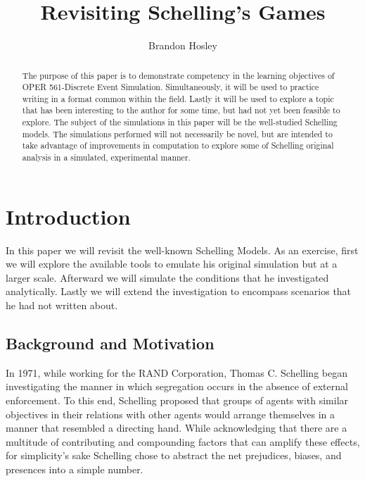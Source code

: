 \documentclass[sigplan,nonacm]{acmart}
\begin{document}
\title{Revisiting Schelling's Games}

\author{Brandon Hosley}


\begin{abstract}
	The purpose of this paper is to demonstrate competency in the learning 
	objectives of OPER 561-Discrete Event Simulation.
	Simultaneously, it will be used to practice writing in a format
	common within the field.
	Lastly it will be used to explore a topic that has been interesting
	to the author for some time, but had not yet been feasible to explore.
	The subject of the simulations in this paper will be the well-studied
	Schelling models. The simulations performed will not necessarily be
	novel, but are intended to take advantage of improvements in computation
	to explore some of Schelling original analysis in a simulated, experimental manner.
\end{abstract}



\maketitle

\section{Introduction}

In this paper we will revisit the well-known Schelling Models\cite{Schelling1971}.
As an exercise, first we will explore the available tools to emulate his original
simulation but at a larger scale.
Afterward we will simulate the conditions that he investigated analytically.
Lastly we will extend the investigation to encompass scenarios that he had not
written about.

\subsection{Background and Motivation}

In 1971, while working for the RAND Corporation, Thomas C. Schelling began investigating
the manner in which segregation occurs in the absence of external enforcement.
To this end, Schelling proposed that groups of agents with similar objectives in their relations
with other agents would arrange themselves in a manner that resembled a directing hand.
While acknowledging that there are a multitude of contributing and compounding factors that can amplify these effects, 
for simplicity's sake Schelling chose to abstract the net prejudices, biases, and presences into a simple number.
\end{document}
